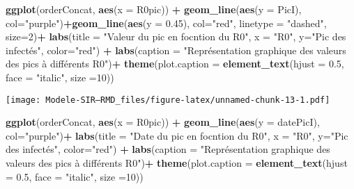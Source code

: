 \documentclass[
]{article}
\newenvironment{Shaded}{\begin{snugshade}}{\end{snugshade}}
\newcommand{\DataTypeTok}[1]{\textcolor[rgb]{0.13,0.29,0.53}{#1}}
\newcommand{\DecValTok}[1]{\textcolor[rgb]{0.00,0.00,0.81}{#1}}
\newcommand{\FloatTok}[1]{\textcolor[rgb]{0.00,0.00,0.81}{#1}}
\newcommand{\KeywordTok}[1]{\textcolor[rgb]{0.13,0.29,0.53}{\textbf{#1}}}
\newcommand{\NormalTok}[1]{#1}
\newcommand{\OperatorTok}[1]{\textcolor[rgb]{0.81,0.36,0.00}{\textbf{#1}}}
\newcommand{\StringTok}[1]{\textcolor[rgb]{0.31,0.60,0.02}{#1}}
\begin{document}
\begin{Shaded}
\begin{Highlighting}[]
\KeywordTok{ggplot}\NormalTok{(orderConcat, }\KeywordTok{aes}\NormalTok{(}\DataTypeTok{x =}\NormalTok{ R0pic)) }\OperatorTok{+}\StringTok{ }\KeywordTok{geom_line}\NormalTok{(}\KeywordTok{aes}\NormalTok{(}\DataTypeTok{y =}\NormalTok{ PicI), }\DataTypeTok{col=}\StringTok{"purple"}\NormalTok{)}\OperatorTok{+}\KeywordTok{geom_line}\NormalTok{(}\KeywordTok{aes}\NormalTok{(}\DataTypeTok{y =} \FloatTok{0.45}\NormalTok{), }\DataTypeTok{col=}\StringTok{"red"}\NormalTok{, }\DataTypeTok{linetype =} \StringTok{"dashed"}\NormalTok{, }\DataTypeTok{size=}\DecValTok{2}\NormalTok{)}\OperatorTok{+}\StringTok{ }\KeywordTok{labs}\NormalTok{(}\DataTypeTok{title =} \StringTok{"Valeur du pic en focntion du R0"}\NormalTok{, }\DataTypeTok{x =} \StringTok{"R0"}\NormalTok{, }\DataTypeTok{y=}\StringTok{"Pic des infectés"}\NormalTok{, }\DataTypeTok{color=}\StringTok{"red"}\NormalTok{) }\OperatorTok{+}\StringTok{ }\KeywordTok{labs}\NormalTok{(}\DataTypeTok{caption =} \StringTok{"Représentation graphique des valeurs des pics à différents R0"}\NormalTok{)}\OperatorTok{+}\StringTok{ }\KeywordTok{theme}\NormalTok{(}\DataTypeTok{plot.caption =} \KeywordTok{element_text}\NormalTok{(}\DataTypeTok{hjust =} \FloatTok{0.5}\NormalTok{, }\DataTypeTok{face =} \StringTok{"italic"}\NormalTok{, }\DataTypeTok{size =}\DecValTok{10}\NormalTok{))}
\end{Highlighting}
\end{Shaded}

\texttt{[image: Modele-SIR---RMD\_files/figure-latex/unnamed-chunk-13-1.pdf]}

\begin{Shaded}
\begin{Highlighting}[]
 \KeywordTok{ggplot}\NormalTok{(orderConcat, }\KeywordTok{aes}\NormalTok{(}\DataTypeTok{x =}\NormalTok{ R0pic)) }\OperatorTok{+}\StringTok{ }\KeywordTok{geom_line}\NormalTok{(}\KeywordTok{aes}\NormalTok{(}\DataTypeTok{y =}\NormalTok{ datePicI), }\DataTypeTok{col=}\StringTok{"purple"}\NormalTok{)}\OperatorTok{+}\StringTok{ }\KeywordTok{labs}\NormalTok{(}\DataTypeTok{title =} \StringTok{"Date du pic en focntion du R0"}\NormalTok{, }\DataTypeTok{x =} \StringTok{"R0"}\NormalTok{, }\DataTypeTok{y=}\StringTok{"Pic des infectés"}\NormalTok{, }\DataTypeTok{color=}\StringTok{"red"}\NormalTok{) }\OperatorTok{+}\StringTok{ }\KeywordTok{labs}\NormalTok{(}\DataTypeTok{caption =} \StringTok{"Représentation graphique des valeurs des pics à différents R0"}\NormalTok{)}\OperatorTok{+}\StringTok{ }\KeywordTok{theme}\NormalTok{(}\DataTypeTok{plot.caption =} \KeywordTok{element_text}\NormalTok{(}\DataTypeTok{hjust =} \FloatTok{0.5}\NormalTok{, }\DataTypeTok{face =} \StringTok{"italic"}\NormalTok{, }\DataTypeTok{size =}\DecValTok{10}\NormalTok{))}
\end{Highlighting}
\end{Shaded}
\end{document}
